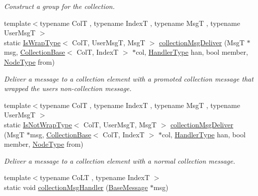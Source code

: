 \begin{DoxyCompactItemize}
\begin{DoxyCompactList}\small\item\em Construct a group for the collection. \end{DoxyCompactList}\item 
{\footnotesize template$<$typename ColT , typename IndexT , typename MsgT , typename User\+MsgT $>$ }\\static \hyperlink{structvt_1_1vrt_1_1collection_1_1_collection_manager_a1f91c97ed52237c3a3576dfbbe87c8f8}{Is\+Wrap\+Type}$<$ ColT, User\+MsgT, MsgT $>$ \hyperlink{structvt_1_1vrt_1_1collection_1_1_collection_manager_a8335935e585268654043862f312d9fa0}{collection\+Msg\+Deliver} (MsgT $\ast$msg, \hyperlink{structvt_1_1vrt_1_1collection_1_1_collection_base}{Collection\+Base}$<$ ColT, IndexT $>$ $\ast$col, \hyperlink{namespacevt_af64846b57dfcaf104da3ef6967917573}{Handler\+Type} han, bool member, \hyperlink{namespacevt_a866da9d0efc19c0a1ce79e9e492f47e2}{Node\+Type} from)
\begin{DoxyCompactList}\small\item\em Deliver a message to a collection element with a promoted collection message that wrapped the user\textquotesingle{}s non-\/collection message. \end{DoxyCompactList}\item 
{\footnotesize template$<$typename ColT , typename IndexT , typename MsgT , typename User\+MsgT $>$ }\\static \hyperlink{structvt_1_1vrt_1_1collection_1_1_collection_manager_a18e3a17d9eb086c6c2f499242b7faa1e}{Is\+Not\+Wrap\+Type}$<$ ColT, User\+MsgT, MsgT $>$ \hyperlink{structvt_1_1vrt_1_1collection_1_1_collection_manager_ac92b9519a9c22103746e52375bc18b67}{collection\+Msg\+Deliver} (MsgT $\ast$msg, \hyperlink{structvt_1_1vrt_1_1collection_1_1_collection_base}{Collection\+Base}$<$ ColT, IndexT $>$ $\ast$col, \hyperlink{namespacevt_af64846b57dfcaf104da3ef6967917573}{Handler\+Type} han, bool member, \hyperlink{namespacevt_a866da9d0efc19c0a1ce79e9e492f47e2}{Node\+Type} from)
\begin{DoxyCompactList}\small\item\em Deliver a message to a collection element with a normal collection message. \end{DoxyCompactList}\item 
{\footnotesize template$<$typename Co\+LT , typename IndexT $>$ }\\static void \hyperlink{structvt_1_1vrt_1_1collection_1_1_collection_manager_a9b2bfe1f74298f0e9b7fdc4888f73e3d}{collection\+Msg\+Handler} (\hyperlink{namespacevt_ac34f95a5e2b8109b55bfba52b074443d}{Base\+Message} $\ast$msg)

\end{DoxyCompactItemize}
